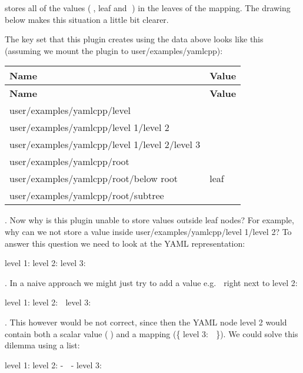 stores all of the values ({\ttfamily 🍂}, {\ttfamily leaf} and {\ttfamily 🍁}) in the leaves of the mapping. The drawing below makes this situation a little bit clearer.



The key set that this plugin creates using the data above looks like this (assuming we mount the plugin to {\ttfamily user/examples/yamlcpp})\+:

\tabulinesep=1mm
\begin{longtabu} spread 0pt [c]{*{2}{|X[-1]}|}
\hline
\rowcolor{\tableheadbgcolor}\textbf{ Name }&\textbf{ Value  }\\
\endfirsthead
\hline
\endfoot
\hline
\rowcolor{\tableheadbgcolor}\textbf{ Name }&\textbf{ Value  }\\
\endhead
user/examples/yamlcpp/level &\\
user/examples/yamlcpp/level 1/level 2 &\\
user/examples/yamlcpp/level 1/level 2/level 3 &🍁 \\
user/examples/yamlcpp/root &\\
user/examples/yamlcpp/root/below root &leaf \\
user/examples/yamlcpp/root/subtree &🍂 \\
\end{longtabu}
. Now why is this plugin unable to store values outside leaf nodes? For example, why can we not store a value inside {\ttfamily user/examples/yamlcpp/level 1/level 2}? To answer this question we need to look at the Y\+A\+ML representation\+:


\begin{DoxyCode}
level 1:
  level 2:
    level 3:  🍁
\end{DoxyCode}


. In a naive approach we might just try to add a value e.\+g. {\ttfamily 🙈} right next to level 2\+:


\begin{DoxyCode}
level 1:
  level 2: 🙈
    level 3:  🍁
\end{DoxyCode}


. This however would be not correct, since then the Y\+A\+ML node {\ttfamily level 2} would contain both a scalar value ({\ttfamily 🙈}) and a mapping ({\ttfamily \{ level 3\+: 🍁 \}}). We could solve this dilemma using a list\+:


\begin{DoxyCode}
level 1:
  level 2:
    - 🙈
    - level 3:  🍁
\end{DoxyCode}


